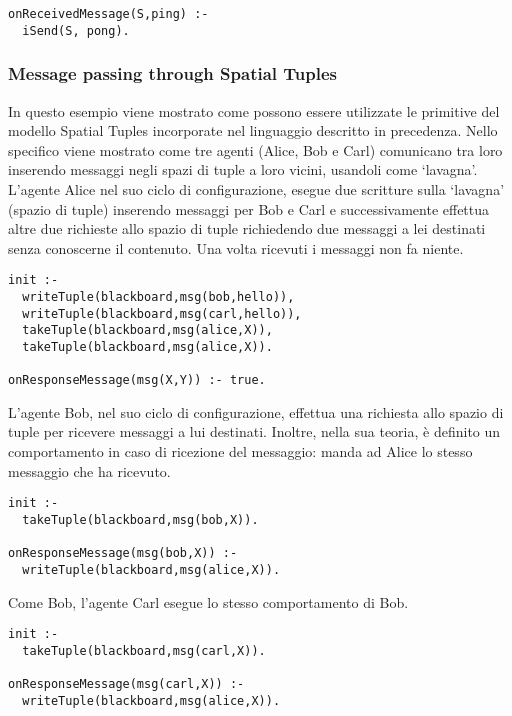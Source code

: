 \medskip
\begin{lstlisting}[firstnumber=1,label={lst:PongAgent},caption={Agente Pong}]
onReceivedMessage(S,ping) :-
  iSend(S, pong).
\end{lstlisting}

\subsubsection{Message passing through Spatial Tuples}
In questo esempio viene mostrato come possono essere utilizzate le primitive del modello Spatial Tuples incorporate nel linguaggio descritto in precedenza. Nello specifico viene mostrato come tre agenti (Alice, Bob e Carl) comunicano tra loro inserendo messaggi negli spazi di tuple a loro vicini, usandoli come `lavagna'.
L'agente Alice nel suo ciclo di configurazione, esegue due scritture sulla `lavagna' (spazio di tuple) inserendo messaggi per Bob e Carl e successivamente effettua altre due richieste allo spazio di tuple richiedendo due messaggi a lei destinati senza conoscerne il contenuto. Una volta ricevuti i messaggi non fa niente.

\medskip
\begin{lstlisting}[firstnumber=1,label={lst:Alice},caption={Alice}]
init :-
  writeTuple(blackboard,msg(bob,hello)),
  writeTuple(blackboard,msg(carl,hello)),
  takeTuple(blackboard,msg(alice,X)),
  takeTuple(blackboard,msg(alice,X)).

onResponseMessage(msg(X,Y)) :- true.
\end{lstlisting}

L'agente Bob, nel suo ciclo di configurazione, effettua una richiesta allo spazio di tuple per ricevere messaggi a lui destinati. Inoltre, nella sua teoria, è definito un comportamento in caso di ricezione del messaggio: manda ad Alice lo stesso messaggio che ha ricevuto.
\medskip
\begin{lstlisting}[firstnumber=1,label={lst:Bob},caption={Bob}]
init :-
  takeTuple(blackboard,msg(bob,X)).

onResponseMessage(msg(bob,X)) :-
  writeTuple(blackboard,msg(alice,X)).
\end{lstlisting}

Come Bob, l'agente Carl esegue lo stesso comportamento di Bob.
\medskip
\begin{lstlisting}[firstnumber=1,label={lst:Carl},caption={Carl}]
init :-
  takeTuple(blackboard,msg(carl,X)).

onResponseMessage(msg(carl,X)) :-
  writeTuple(blackboard,msg(alice,X)).
\end{lstlisting}
